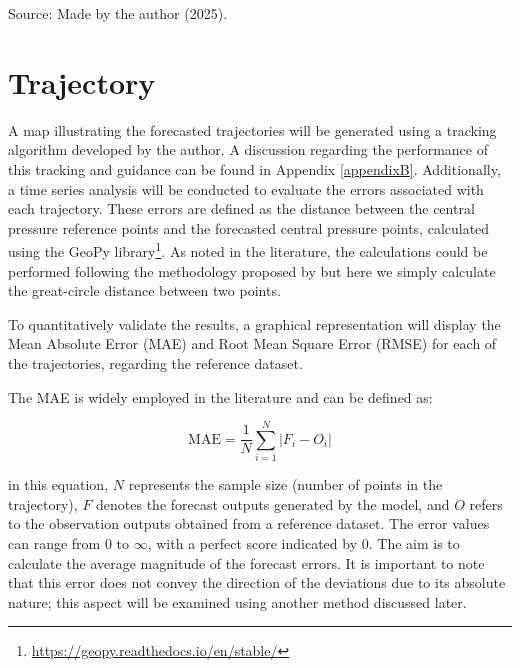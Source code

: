 \begin{center}
Source: Made by the author (2025).
\end{center}


\section{Trajectory}

A map illustrating the forecasted trajectories will be generated using a tracking algorithm developed by the author. A discussion regarding the performance of this tracking and guidance can be found in Appendix \ref{appendixB}. Additionally, a time series analysis will be conducted to evaluate the errors associated with each trajectory. These errors are defined as the distance between the central pressure reference points and the forecasted central pressure points, calculated using the GeoPy library\footnote{\href{https://geopy.readthedocs.io/en/stable/}{https://geopy.readthedocs.io/en/stable/}}. As noted in the literature, the calculations could be performed following the methodology proposed by  but here we simply calculate the great-circle distance between two points. 

To quantitatively validate the results, a graphical representation will display the Mean Absolute Error (MAE) and Root Mean Square Error (RMSE) for each of the trajectories, regarding the reference dataset.

The MAE is widely employed \cite{ditchek2023improving, nyongesa2024influence} in the literature and can be defined as:

\begin{equation}
    \text{MAE} = \frac{1}{N}\sum_{i=1}^{N} |F_i -O_i|
\end{equation}

\noindent in this equation, $N$ represents the sample size (number of points in the trajectory), $F$ denotes the forecast outputs generated by the model, and $O$ refers to the observation outputs obtained from a reference dataset. The error values can range from 0 to $\infty$, with a perfect score indicated by 0. The aim is to calculate the average magnitude of the forecast errors. It is important to note that this error does not convey the direction of the deviations due to its absolute nature; this aspect will be examined using another method discussed later.

